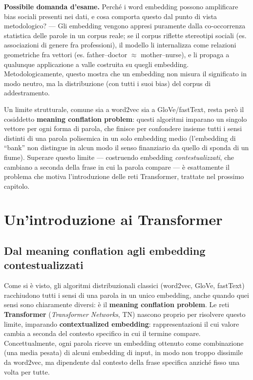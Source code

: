 \documentclass[11pt,a4paper]{report}
\newcommand{\domandaesame}[1]{\begin{esame}\textbf{Possibile domanda d'esame.} #1\end{esame}}
\begin{document}
\domandaesame{Perché i word embedding possono amplificare bias sociali presenti nei dati, e cosa comporta questo dal punto di vista metodologico? --- Gli embedding vengono appresi puramente dalla co-occorrenza statistica delle parole in un corpus reale; se il corpus riflette stereotipi sociali (es. associazioni di genere fra professioni), il modello li internalizza come relazioni geometriche fra vettori (es. father--doctor $\approx$ mother--nurse), e li propaga a qualunque applicazione a valle costruita su quegli embedding. Metodologicamente, questo mostra che un embedding non misura il significato in modo neutro, ma la distribuzione (con tutti i suoi bias) del corpus di addestramento.}

Un limite strutturale, comune sia a word2vec sia a GloVe/fastText, resta però il cosiddetto \textbf{meaning conflation problem}: questi algoritmi imparano un singolo vettore per ogni forma di parola, che finisce per confondere insieme tutti i sensi distinti di una parola polisemica in un solo embedding medio (l'embedding di ``bank'' non distingue in alcun modo il senso finanziario da quello di sponda di un fiume). Superare questo limite --- costruendo embedding \emph{contestualizzati}, che cambiano a seconda della frase in cui la parola compare --- è esattamente il problema che motiva l'introduzione delle reti Transformer, trattate nel prossimo capitolo.

\chapter{Un'introduzione ai Transformer}

\section{Dal meaning conflation agli embedding contestualizzati}
\label{sec:transformers-intro}

Come si è visto, gli algoritmi distribuzionali classici (word2vec, GloVe, fastText) racchiudono tutti i sensi di una parola in un unico embedding, anche quando quei sensi sono chiaramente diversi: è il \textbf{meaning conflation problem}. Le reti \textbf{Transformer} (\emph{Transformer Networks}, TN) nascono proprio per risolvere questo limite, imparando \textbf{contextualized embedding}: rappresentazioni il cui valore cambia a seconda del contesto specifico in cui il termine compare. Concettualmente, ogni parola riceve un embedding ottenuto come combinazione (una media pesata) di alcuni embedding di input, in modo non troppo dissimile da word2vec, ma dipendente dal contesto della frase specifica anziché fisso una volta per tutte.
\end{document}
